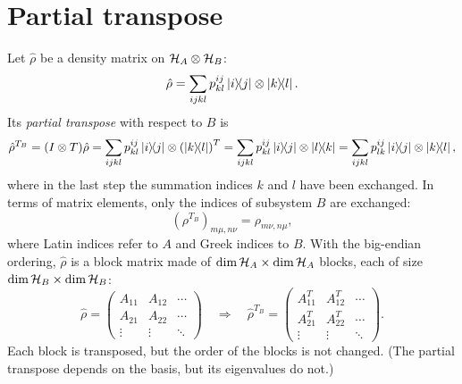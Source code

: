 \section{Partial transpose}
Let $\hat\rho$ be a density matrix on $\mathcal H_A\otimes\mathcal H_B$:
\begin{equation}
  \hat\rho=\sum_{ijkl}p^{ij}_{kl}\left|i\middle\rangle\!\middle\langle j\right|\otimes\left|k\middle\rangle\!\middle\langle l\right|.
\end{equation}
Its \emph{partial transpose} with respect to $B$ is
\begin{equation}
  \hat\rho^{T_B}=(I\otimes T)\hat\rho=\sum_{ijkl}p^{ij}_{kl}\left|i\middle\rangle\!\middle\langle j\right|\otimes\left(\left|k\middle\rangle\!\middle\langle l\right|\right)^T=\sum_{ijkl}p^{ij}_{kl}\left|i\middle\rangle\!\middle\langle j\right|\otimes\left|l\middle\rangle\!\middle\langle k\right|
  =\sum_{ijkl}p^{ij}_{lk}\left|i\middle\rangle\!\middle\langle j\right|\otimes\left|k\middle\rangle\!\middle\langle l\right|,
\end{equation}
where in the last step the summation indices $k$ and $l$ have been exchanged. In terms of matrix elements, only the indices of subsystem $B$ are exchanged:
\begin{equation}
  \left(\rho^{T_B}\right)_{m\mu,n\nu}=\rho_{m\nu,n\mu},
\end{equation}
where Latin indices refer to $A$ and Greek indices to $B$. With the big-endian ordering, $\hat\rho$ is a block matrix made of $\dim\mathcal H_A\times\dim\mathcal H_A$ blocks, each of size
$\dim\mathcal H_B\times\dim\mathcal H_B$:
\begin{equation}
  \hat\rho=\begin{pmatrix}A_{11}&A_{12}&\cdots\\A_{21}&A_{22}&\cdots\\ \vdots&\vdots&\ddots\end{pmatrix}\quad\Longrightarrow\quad
  \hat\rho^{T_B}=\begin{pmatrix}A_{11}^T&A_{12}^T&\cdots\\A_{21}^T&A_{22}^T&\cdots\\ \vdots&\vdots&\ddots\end{pmatrix}.
\end{equation}
Each block is transposed, but the order of the blocks is not changed. (The partial transpose depends on the basis, but its eigenvalues do not.)

